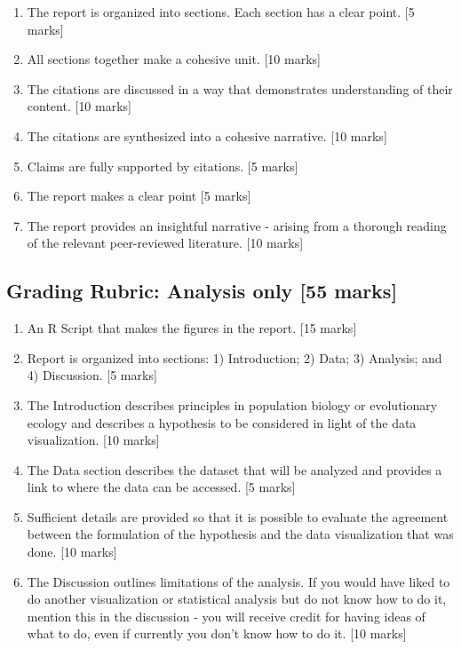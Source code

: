 \documentclass[]{book}
\begin{document}
\begin{enumerate}
\def\labelenumi{\arabic{enumi}.}
\item
  The report is organized into sections. Each section has a clear point.
  {[}5 marks{]}
\item
  All sections together make a cohesive unit. {[}10 marks{]}
\item
  The citations are discussed in a way that demonstrates understanding
  of their content. {[}10 marks{]}
\item
  The citations are synthesized into a cohesive narrative. {[}10
  marks{]}
\item
  Claims are fully supported by citations. {[}5 marks{]}
\item
  The report makes a clear point {[}5 marks{]}
\item
  The report provides an insightful narrative - arising from a thorough
  reading of the relevant peer-reviewed literature. {[}10 marks{]}
\end{enumerate}

\subsection{Grading Rubric: Analysis only {[}55
marks{]}}\label{grading-rubric-analysis-only-55-marks}

\begin{enumerate}
\def\labelenumi{\arabic{enumi}.}
\item
  An R Script that makes the figures in the report. {[}15 marks{]}
\item
  Report is organized into sections: 1) Introduction; 2) Data; 3)
  Analysis; and 4) Discussion. {[}5 marks{]}
\item
  The Introduction describes principles in population biology or
  evolutionary ecology and describes a hypothesis to be considered in
  light of the data visualization. {[}10 marks{]}
\item
  The Data section describes the dataset that will be analyzed and
  provides a link to where the data can be accessed. {[}5 marks{]}
\item
  Sufficient details are provided so that it is possible to evaluate the
  agreement between the formulation of the hypothesis and the data
  visualization that was done. {[}10 marks{]}
\item
  The Discussion outlines limitations of the analysis. If you would have
  liked to do another visualization or statistical analysis but do not
  know how to do it, mention this in the discussion - you will receive
  credit for having ideas of what to do, even if currently you don't
  know how to do it. {[}10 marks{]}
\end{enumerate}

\backmatter
\end{document}
